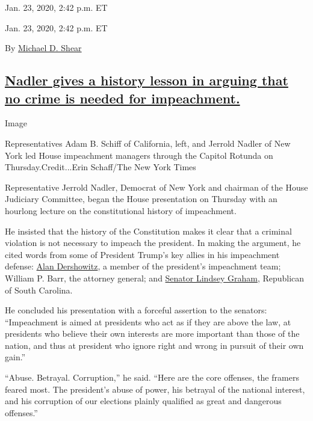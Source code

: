 Jan. 23, 2020, 2:42 p.m. ET

Jan. 23, 2020, 2:42 p.m. ET

By \href{https://www.nytimes3xbfgragh.onion/by/michael-d-shear}{Michael
D. Shear}

\hypertarget{nadler-gives-a-history-lesson-in-arguing-that-no-crime-is-needed-for-impeachment}{%
\subsection{\texorpdfstring{\protect\hyperlink{nadler-gives-a-history-lesson-in-arguing-that-no-crime-is-needed-for-impeachment}{Nadler
gives a history lesson in arguing that no crime is needed for
impeachment.}}{Nadler gives a history lesson in arguing that no crime is needed for impeachment.}}\label{nadler-gives-a-history-lesson-in-arguing-that-no-crime-is-needed-for-impeachment}}

Image

Representatives Adam B. Schiff of California, left, and Jerrold Nadler
of New York led House impeachment managers through the Capitol Rotunda
on Thursday.Credit...Erin Schaff/The New York Times

Representative Jerrold Nadler, Democrat of New York and chairman of the
House Judiciary Committee, began the House presentation on Thursday with
an hourlong lecture on the constitutional history of impeachment.

He insisted that the history of the Constitution makes it clear that a
criminal violation is not necessary to impeach the president. In making
the argument, he cited words from some of President Trump's key allies
in his impeachment defense:
\href{https://www.nytimes3xbfgragh.onion/2020/01/17/us/politics/alan-dershowitz-trump.html}{Alan
Dershowitz}, a member of the president's impeachment team; William P.
Barr, the attorney general; and
\href{https://www.nytimes3xbfgragh.onion/live/2020/impeachment-trial-live-01-23/senator-lindsey-graham-misses-a-clip-of-a-speech-he-made-during-clintons-trial-in-1999\#live-blog-list}{Senator
Lindsey Graham}, Republican of South Carolina.

He concluded his presentation with a forceful assertion to the senators:
``Impeachment is aimed at presidents who act as if they are above the
law, at presidents who believe their own interests are more important
than those of the nation, and thus at president who ignore right and
wrong in pursuit of their own gain.''

``Abuse. Betrayal. Corruption,'' he said. ``Here are the core offenses,
the framers feared most. The president's abuse of power, his betrayal of
the national interest, and his corruption of our elections plainly
qualified as great and dangerous offenses.''


